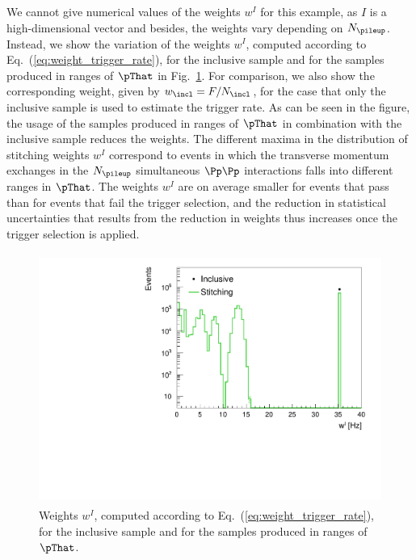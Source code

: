 We cannot give numerical values of the weights $w^{I}$ for this example,
as $I$ is a high-dimensional vector and besides, the weights vary depending on $N_{\pileup}$.
Instead, we show the variation of the weights $w^{I}$, computed according to Eq.~(\ref{eq:weight_trigger_rate}),
for the inclusive sample and for the samples produced in ranges of $\pThat$ in Fig.~\ref{fig:weight_trigger_rate}.
For comparison, we also show the corresponding weight, given by $w_{\incl} = F/N_{\incl}$,
for the case that only the inclusive sample is used to estimate the trigger rate.
As can be seen in the figure, the usage of the samples produced in ranges of $\pThat$ in combination with the inclusive sample reduces the weights.
The different maxima in the distribution of stitching weights $w^{I}$ correspond to events 
in which the transverse momentum exchanges in the $N_{\pileup}$ simultaneous $\Pp\Pp$ interactions falls into different ranges in $\pThat$.
The weights $w^{I}$ are on average smaller for events that pass than for events that fail the trigger selection,
and the reduction in statistical uncertainties that results from the reduction in weights thus increases once the trigger selection is applied.

\begin{figure}
\setlength{\unitlength}{1mm}
\begin{center}
\includegraphics*[height=82mm]{plots/makeEvtWeightPlotsForPaper_evtWeight_log.pdf}
\end{center}
\caption{
  Weights $w^{I}$, computed according to Eq.~(\ref{eq:weight_trigger_rate}), 
  for the inclusive sample and for the samples produced in ranges of $\pThat$.
}
\label{fig:weight_trigger_rate}
\end{figure}

